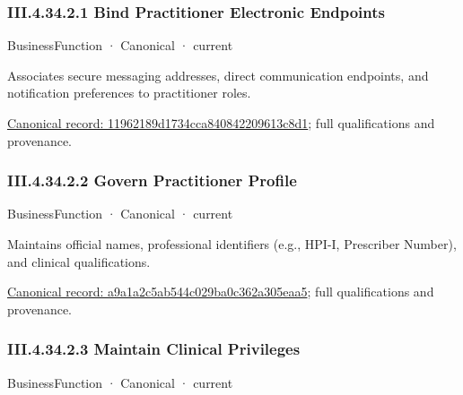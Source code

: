 \subsubsection*{III.4.34.2.1 Bind Practitioner Electronic Endpoints}
\label{navigation:III.4.34.2.1}

\label{element:11962189d1734cca840842209613c8d1}
{\small BusinessFunction · Canonical · current}\par

Associates secure messaging addresses, direct communication endpoints, and notification preferences to practitioner roles.


{\footnotesize \href{../../../../continuum/business/business-function/11962189d1734cca840842209613c8d1.md}{Canonical record: 11962189d1734cca840842209613c8d1}; full qualifications and provenance.}\par
\subsubsection*{III.4.34.2.2 Govern Practitioner Profile}
\label{navigation:III.4.34.2.2}

\label{element:a9a1a2c5ab544c029ba0c362a305eaa5}
{\small BusinessFunction · Canonical · current}\par

Maintains official names, professional identifiers (e.g., HPI-I, Prescriber Number), and clinical qualifications.


{\footnotesize \href{../../../../continuum/business/business-function/a9a1a2c5ab544c029ba0c362a305eaa5.md}{Canonical record: a9a1a2c5ab544c029ba0c362a305eaa5}; full qualifications and provenance.}\par
\subsubsection*{III.4.34.2.3 Maintain Clinical Privileges}
\label{navigation:III.4.34.2.3}

\label{element:4965ae4538cc42cd8af1bd9a1905b108}
{\small BusinessFunction · Canonical · current}\par


